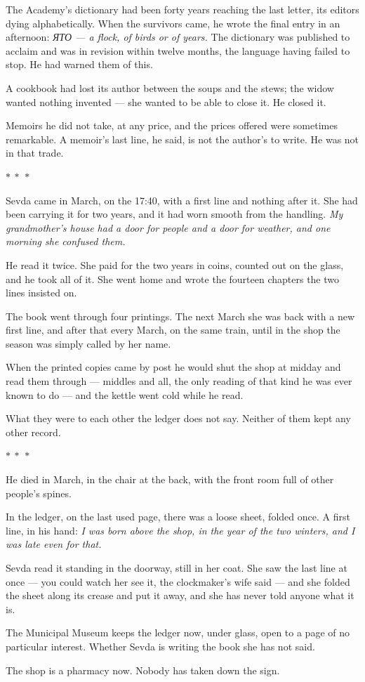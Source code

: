 \documentclass[11pt]{article}
\newcommand{\separator}{\begin{center}\vspace{6pt}$\ast\ \ast\ \ast$\vspace{6pt}\end{center}}
\begin{document}
The Academy's dictionary had been forty years reaching the last letter, its editors dying alphabetically. When the survivors came, he wrote the final entry in an afternoon: \emph{ЯТО — a flock, of birds or of years.} The dictionary was published to acclaim and was in revision within twelve months, the language having failed to stop. He had warned them of this.

A cookbook had lost its author between the soups and the stews; the widow wanted nothing invented — she wanted to be able to close it. He closed it.

Memoirs he did not take, at any price, and the prices offered were sometimes remarkable. A memoir's last line, he said, is not the author's to write. He was not in that trade.

\separator

Sevda came in March, on the 17:40, with a first line and nothing after it. She had been carrying it for two years, and it had worn smooth from the handling. \emph{My grandmother's house had a door for people and a door for weather, and one morning she confused them.}

He read it twice. She paid for the two years in coins, counted out on the glass, and he took all of it. She went home and wrote the fourteen chapters the two lines insisted on.

The book went through four printings. The next March she was back with a new first line, and after that every March, on the same train, until in the shop the season was simply called by her name.

When the printed copies came by post he would shut the shop at midday and read them through — middles and all, the only reading of that kind he was ever known to do — and the kettle went cold while he read.

What they were to each other the ledger does not say. Neither of them kept any other record.

\separator

He died in March, in the chair at the back, with the front room full of other people's spines.

In the ledger, on the last used page, there was a loose sheet, folded once. A first line, in his hand: \emph{I was born above the shop, in the year of the two winters, and I was late even for that.}

Sevda read it standing in the doorway, still in her coat. She saw the last line at once — you could watch her see it, the clockmaker's wife said — and she folded the sheet along its crease and put it away, and she has never told anyone what it is.

The Municipal Museum keeps the ledger now, under glass, open to a page of no particular interest. Whether Sevda is writing the book she has not said.

The shop is a pharmacy now. Nobody has taken down the sign.
\end{document}
